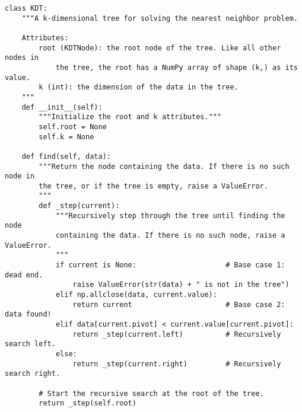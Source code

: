 \begin{lstlisting}
class KDT:
    """A k-dimensional tree for solving the nearest neighbor problem.

    Attributes:
        root (KDTNode): the root node of the tree. Like all other nodes in
            the tree, the root has a NumPy array of shape (k,) as its value.
        k (int): the dimension of the data in the tree.
    """
    def __init__(self):
        """Initialize the root and k attributes."""
        self.root = None
        self.k = None

    def find(self, data):
        """Return the node containing the data. If there is no such node in
        the tree, or if the tree is empty, raise a ValueError.
        """
        def _step(current):
            """Recursively step through the tree until finding the node
            containing the data. If there is no such node, raise a ValueError.
            """
            if current is None:                     # Base case 1: dead end.
                raise ValueError(str(data) + " is not in the tree")
            elif np.allclose(data, current.value):
                return current                      # Base case 2: data found!
            elif data[current.pivot] < current.value[current.pivot]:
                return _step(current.left)          # Recursively search left.
            else:
                return _step(current.right)         # Recursively search right.

        # Start the recursive search at the root of the tree.
        return _step(self.root)
\end{lstlisting}

